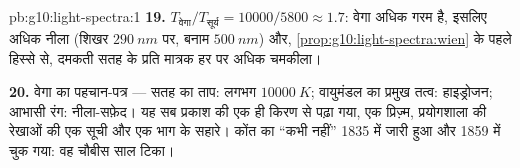 \begin{solution}{pb:g10:light-spectra:1}
\textbf{19.} $T_{\text{वेगा}} / T_{\text{सूर्य}} = 10000 / 5800 \approx
1.7$: वेगा अधिक गरम है, इसलिए अधिक नीला (शिखर $\qty{290}{nm}$
पर, बनाम $\qty{500}{nm}$) और, \cref{prop:g10:light-spectra:wien} के पहले हिस्से से, दमकती सतह के प्रति
मात्रक हर  पर अधिक चमकीला।

\textbf{20.} वेगा का पहचान-पत्र --- सतह का ताप: लगभग $\qty{10000}{K}$;
वायुमंडल का प्रमुख तत्व: हाइड्रोजन; आभासी रंग: नीला-सफ़ेद। यह सब
प्रकाश की एक ही किरण से पढ़ा गया, एक प्रिज़्म, प्रयोगशाला की रेखाओं की
एक सूची और एक भाग के सहारे। कोंत का ``कभी नहीं'' 1835 में जारी हुआ और
1859 में चुक गया: वह चौबीस साल टिका।
\end{solution}
